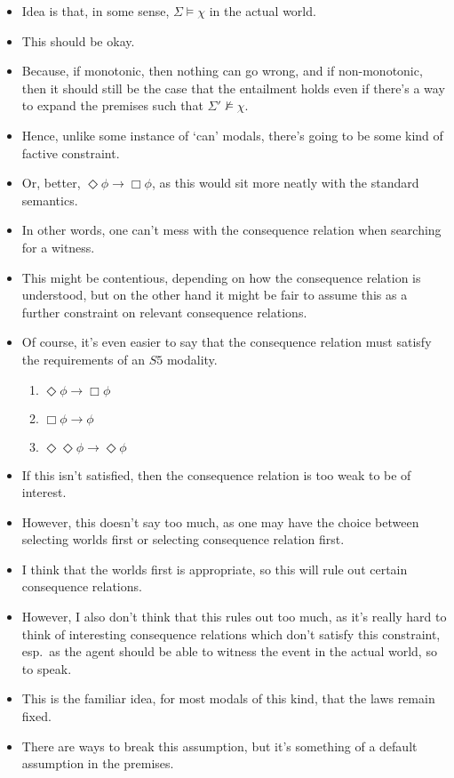 \documentclass[10pt]{article}
\begin{document}
\begin{itemize}
\item Idea is that, in some sense, \(\Sigma \vDash \chi\) in the actual world.
\item This should be okay.
\item Because, if monotonic, then nothing can go wrong, and if non-monotonic, then it should still be the case that the entailment holds even if there's a way to expand the premises such that \(\Sigma' \nvDash \chi\).
\item Hence, unlike some instance of `can' modals, there's going to be some kind of factive constraint.
\item Or, better, \(\Diamond\phi \rightarrow \Box\phi\), as this would sit more neatly with the standard semantics.
\item In other words, one can't mess with the consequence relation when searching for a witness.
\item This might be contentious, depending on how the consequence relation is understood, but on the other hand it might be fair to assume this as a further constraint on relevant consequence relations.
\item Of course, it's even easier to say that the consequence relation must satisfy the requirements of an \(S5\) modality.
  \begin{enumerate}
  \item \(\Diamond\phi \rightarrow \Box\phi\)
  \item \(\Box\phi \rightarrow \phi\)
  \item \(\Diamond\Diamond\phi \rightarrow \Diamond\phi\)
  \end{enumerate}
\item If this isn't satisfied, then the consequence relation is too weak to be of interest.
\item However, this doesn't say too much, as one may have the choice between selecting worlds first or selecting consequence relation first.
\item I think that the worlds first is appropriate, so this will rule out certain consequence relations.
\item However, I also don't think that this rules out too much, as it's really hard to think of interesting consequence relations which don't satisfy this constraint, esp.\ as the agent should be able to witness the event in the actual world, so to speak.
\item This is the familiar idea, for most modals of this kind, that the laws remain fixed.
\item There are ways to break this assumption, but it's something of a default assumption in the premises.
\end{itemize}
\end{document}
